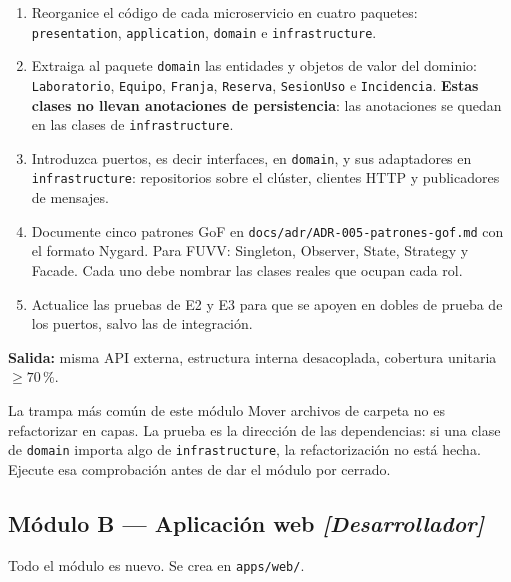 \documentclass[11pt,a4paper]{article}
\begin{document}
\begin{enumerate}[leftmargin=*,itemsep=3pt]
	\item Reorganice el código de cada microservicio en cuatro paquetes: \texttt{presentation}, \texttt{application}, \texttt{domain} e \texttt{infrastructure}.
	\item Extraiga al paquete \texttt{domain} las entidades y objetos de valor del dominio: \texttt{Laboratorio}, \texttt{Equipo}, \texttt{Franja}, \texttt{Reserva}, \texttt{SesionUso} e \texttt{Incidencia}. \textbf{Estas clases no llevan anotaciones de persistencia}: las anotaciones se quedan en las clases de \texttt{infrastructure}.
	\item Introduzca puertos, es decir interfaces, en \texttt{domain}, y sus adaptadores en \texttt{infrastructure}: repositorios sobre el clúster, clientes HTTP y publicadores de mensajes.
	\item Documente cinco patrones GoF en \texttt{docs/adr/ADR-005-\allowbreak patrones-gof.md} con el formato Nygard. Para FUVV: Singleton, Observer, State, Strategy y Facade. Cada uno debe nombrar las clases reales que ocupan cada rol.
	\item Actualice las pruebas de E2 y E3 para que se apoyen en dobles de prueba de los puertos, salvo las de integración.
\end{enumerate}

\textbf{Salida:} misma API externa, estructura interna desacoplada, cobertura unitaria $\geq 70\,\%$.

\begin{avisoBox}{La trampa más común de este módulo}
	Mover archivos de carpeta no es refactorizar en capas. La prueba es la dirección de las dependencias: si una clase de \texttt{domain} importa algo de \texttt{infrastructure}, la refactorización no está hecha. Ejecute esa comprobación antes de dar el módulo por cerrado.
\end{avisoBox}

\subsection{Módulo B --- Aplicación web \emph{[Desarrollador]}}

Todo el módulo es nuevo. Se crea en \texttt{apps/web/}.
\end{document}

